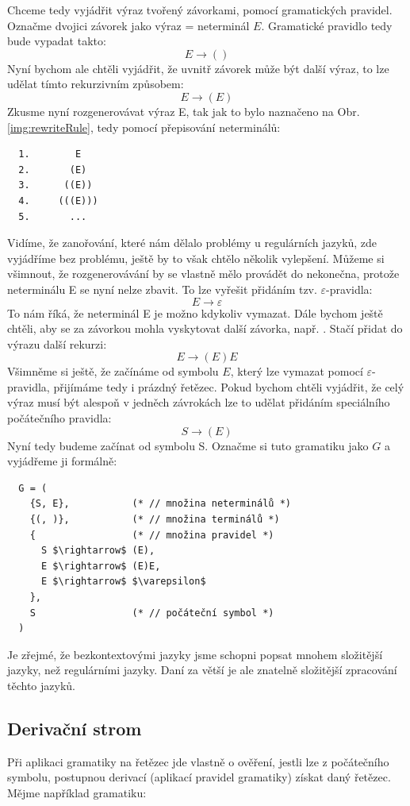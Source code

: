 Chceme tedy vyjádřit výraz tvořený závorkami, pomocí gramatických pravidel.
Označme dvojici závorek jako výraz = neterminál $E$. Gramatické pravidlo tedy bude
vypadat takto:
\[E \rightarrow ()\]
Nyní bychom ale chtěli vyjádřit, že uvnitř závorek může být další výraz, to
lze udělat tímto rekurzivním způsobem:
\[E \rightarrow (E)\]
Zkusme nyní rozgenerovávat výraz E, tak jak to bylo naznačeno na Obr. \ref{img:rewriteRule},
tedy pomocí přepisování neterminálů:
\begin{lstlisting}
  1.        E
  2.       (E)
  3.      ((E))
  4.     (((E)))
  5.       ...
\end{lstlisting}
Vidíme, že zanořování, které nám dělalo problémy u regulárních jazyků, zde vyjádříme bez problému,
ještě by to však chtělo několik vylepšení.
Můžeme si všimnout, že rozgenerovávání by se vlastně mělo provádět do nekonečna,
protože neterminálu E se nyní nelze zbavit. To lze vyřešit přidáním tzv.
$\varepsilon$-pravidla:
\[E \rightarrow \varepsilon\]
To nám říká, že neterminál E je možno kdykoliv vymazat. Dále bychom ještě chtěli,
aby se za závorkou mohla vyskytovat další závorka, např. \symb{(()())}.
Stačí přidat do výrazu další rekurzi:
\[E \rightarrow (E)E\]
Všimněme si ještě, že začínáme od symbolu $E$, který lze vymazat pomocí
$\varepsilon$-pravidla, přijímáme tedy i prázdný řetězec. Pokud bychom chtěli
vyjádřit, že celý výraz musí být alespoň v jedněch závrokách lze to udělat
přidáním speciálního počátečního pravidla:
\[S \rightarrow (E)\]
Nyní tedy budeme začínat od symbolu S. Označme si tuto gramatiku jako
$G$ a vyjádřeme ji formálně:

\begin{lstlisting}
  G = (
    {S, E},           (* // množina neterminálů *)
    {(, )},           (* // množina terminálů *)
    {                 (* // množina pravidel *)
      S $\rightarrow$ (E),
      E $\rightarrow$ (E)E,
      E $\rightarrow$ $\varepsilon$
    },
    S                 (* // počáteční symbol *)
  )
\end{lstlisting}

Je zřejmé, že bezkontextovými jazyky jsme schopni popsat mnohem
složitější jazyky, než regulárními jazyky. Daní za větší 
je ale znatelně složitější zpracování těchto jazyků.

\subsection{Derivační strom}
\label{subsec:derivationTree}
Při aplikaci gramatiky na řetězec jde vlastně o ověření,
jestli lze z počátečního symbolu,
postupnou derivací (aplikací pravidel gramatiky) získat daný řetězec.
Mějme například gramatiku:

